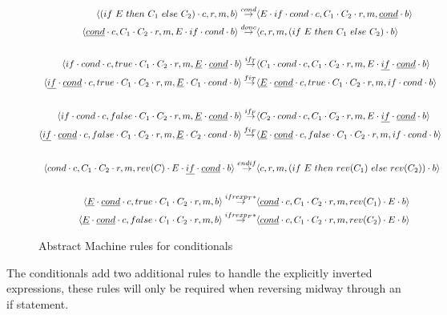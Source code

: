 \begin{figure}[hbt!]
    \centering
    \footnotesize
    \begin{align*}
    \astate{(if\ E\ then\ C_1\ else\ C_2)}{}{}{} \arule{cond}& \astate{E \cdot if \cdot cond}{C_1\cdot C_2}{}{\underline{cond}} \\
    \bstate{\underline{cond}}{C_1 \cdot C_2}{}{E \cdot if \cdot cond} \arule{donc}&
    \bstate{}{}{}{(if\ E\ then\ C_1\ else\ C_2)} \\
    \\
    \astate{if \cdot cond}{true \cdot C_1 \cdot C_2}{}{\underline{E} \cdot \underline{cond}}
    \arule{if_T}&
    \astate{C_1 \cdot cond}{C_1 \cdot C_2}{}{E \cdot \underline{if} \cdot \underline{cond}} \\
    \bstate{\underline{if} \cdot \underline{cond}}{true \cdot C_1 \cdot C_2}{}{\underline{E} \cdot C_1 \cdot cond} 
    \arule{fi_T}&
    \bstate{\underline{E} \cdot \underline{cond}}{true \cdot C_1 \cdot C_2}{}{if \cdot cond} \\
    \\
    \astate{if \cdot cond}{false \cdot C_1 \cdot C_2}{}{\underline{E} \cdot \underline{cond}}
    \arule{if_F}&
    \astate{C_2 \cdot cond}{C_1 \cdot C_2}{}{E \cdot \underline{if} \cdot \underline{cond}} \\
    \bstate{\underline{if} \cdot \underline{cond}}{false \cdot C_1 \cdot C_2}{}{\underline{E} \cdot C_2 \cdot cond} 
    \arule{fi_F}&
    \bstate{\underline{E} \cdot \underline{cond}}{false \cdot C_1 \cdot C_2}{}{if \cdot cond} \\
    \\
    \astate{cond}{C_1 \cdot C_2}{}{rev(C) \cdot E \cdot \underline{if} \cdot \underline{cond}}
    \arule{endif}& \astate{}{}{}{(if\ E\ then\ rev(C_1)\ else\ rev(C_2))} \\
    \\
    \bstate{\underline{E} \cdot \underline{cond}}{true \cdot C_1 \cdot C_2}{}{} 
    \arule{ifrexp_T*}&
    \bstate{\underline{cond}}{C_1 \cdot C_2}{}{rev(C_1) \cdot E} \\
    \bstate{\underline{E} \cdot \underline{cond}}{false \cdot C_1 \cdot C_2}{}{} 
    \arule{ifrexp_F*}&
    \bstate{\underline{cond}}{C_1 \cdot C_2}{}{rev(C_2) \cdot E}
    \end{align*}
    \caption{Abstract Machine rules for conditionals}
    \label{fig:abstract_machine_condition}
\end{figure}

The conditionals add two additional rules to handle the explicitly inverted expressions, these rules will only be required when reversing midway through an if statement.

